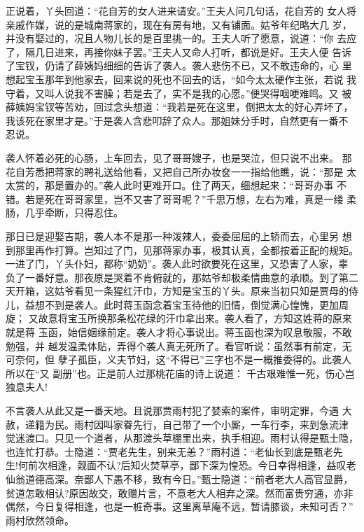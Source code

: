 正说着，丫头回道：“花自芳的女人进来请安。”王夫人问几句话，花自芳的
女人将亲戚作媒，说的是城南蒋家的，现在有房有地，又有铺面。姑爷年纪略大几
岁，并没有娶过的，况且人物儿长的是百里挑一的。王夫人听了愿意，说道：“你
去应了，隔几日进来，再接你妹子罢。”王夫人又命人打听，都说是好。王夫人便
告诉了宝钗，仍请了薛姨妈细细的告诉了袭人。袭人悲伤不已，又不敢违命的，心
里想起宝玉那年到他家去，回来说的死也不回去的话，“如今太太硬作主张，若说
我守着，又叫人说我不害臊；若是去了，实不是我的心愿。”便哭得咽哽难鸣。又
被薛姨妈宝钗等苦劝，回过念头想道：“我若是死在这里，倒把太太的好心弄坏了，
我该死在家里才是。”于是袭人含悲叩辞了众人。那姐妹分手时，自然更有一番不
忍说。

袭人怀着必死的心肠，上车回去，见了哥哥嫂子，也是哭泣，但只说不出来。
那花自芳悉把蒋家的聘礼送给他看，又把自己所办妆奁一一指给他瞧，说：“那是
太太赏的，那是置办的。”袭人此时更难开口。住了两天，细想起来：“哥哥办事
不错。若是死在哥哥家里，岂不又害了哥哥呢？”千思万想，左右为难，真是一缕
柔肠，几乎牵断，只得忍住。

那日已是迎娶吉期，袭人本不是那一种泼辣人，委委屈屈的上轿而去，心里另
想到那里再作打算。岂知过了门，见那蒋家办事，极其认真，全都按着正配的规矩。
一进了门，丫头仆妇，都称“奶奶”。袭人此时欲要死在这里，又恐害了人家，辜
负了一番好意。那夜原是哭着不肯俯就的，那姑爷却极柔情曲意的承顺。到了第二
天开箱，这姑爷看见一条猩红汗巾，方知是宝玉的丫头。原来当初只知是贾母的侍
儿，益想不到是袭人。此时蒋玉函念着宝玉待他的旧情，倒觉满心惶愧，更加周旋；
又故意将宝玉所换那条松花绿的汗巾拿出来。袭人看了，方知这姓蒋的原来就是蒋
玉函，始信姻缘前定。袭人才将心事说出。蒋玉函也深为叹息敬服，不敢勉强，并
越发温柔体贴，弄得个袭人真无死所了。看官听说：虽然事有前定，无可奈何，但
孽子孤臣，义夫节妇，这“不得已”三字也不是一概推委得的。此袭人所以在“又
副册”也。正是前人过那桃花庙的诗上说道：
千古艰难惟一死，伤心岂独息夫人!

不言袭人从此又是一番天地。且说那贾雨村犯了婪索的案件，审明定罪，今遇
大赦，递籍为民。雨村因叫家眷先行，自己带了一个小厮，一车行李，来到急流津
觉迷渡口。只见一个道者，从那渡头草棚里出来，执手相迎。雨村认得是甄士隐，
也连忙打恭。士隐道：“贾老先生，别来无恙？”雨村道：“老仙长到底是甄老先
生!何前次相逢，觌面不认?后知火焚草亭，鄙下深为惶恐。今日幸得相逢，益叹老
仙翁道德高深。奈鄙人下愚不移，致有今日。”甄士隐道：“前者老大人高官显爵，
贫道怎敢相认?原因故交，敢赠片言，不意老大人相弃之深。然而富贵穷通，亦非
偶然，今日复得相逢，也是一桩奇事。这里离草庵不远，暂请膝谈，未知可否？”
雨村欣然领命。

